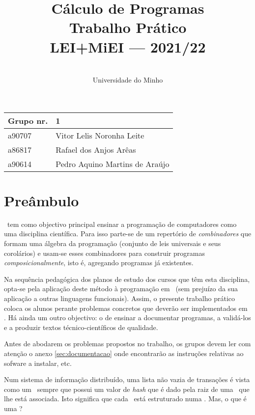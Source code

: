 \documentclass[a4paper]{article}
\title{
          Cálculo de Programas
\\
          Trabalho Prático
\\
          LEI+MiEI --- 2021/22
}
\author{
          \dium
\\
          Universidade do Minho
}
\date\mydate
\begin{document}
\maketitle

\begin{center}\large
\begin{tabular}{ll}
\textbf{Grupo} nr. & 1
\\\hline
a90707 & Vitor Lelis Noronha Leite
\\
a86817 & Rafael dos Anjos Arêas
\\ 
a90614 & Pedro Aquino Martins de Araújo
\end{tabular}
\end{center}

\section{Preâmbulo}

\CP\ tem como objectivo principal ensinar
a progra\-mação de computadores como uma disciplina científica. Para isso
parte-se de um repertório de \emph{combinadores} que formam uma álgebra da
programação (conjunto de leis universais e seus corolários) e usam-se esses
combinadores para construir programas \emph{composicionalmente}, isto é,
agregando programas já existentes.

Na sequência pedagógica dos planos de estudo dos cursos que têm
esta disciplina, opta-se pela aplicação deste método à programação
em \Haskell\ (sem prejuízo da sua aplicação a outras linguagens
funcionais). Assim, o presente trabalho prático coloca os
alunos perante problemas concretos que deverão ser implementados em
\Haskell.  Há ainda um outro objectivo: o de ensinar a documentar
programas, a validá-los e a produzir textos técnico-científicos de
qualidade.

Antes de abodarem os problemas propostos no trabalho, os grupos devem ler
com atenção o anexo \ref{sec:documentacao} onde encontrarão as instruções
relativas ao sofware a instalar, etc.


\Problema

Num sistema de informação distribuído, uma lista não vazia de transações
é vista como um \textit\blockchain\ sempre que possui um valor de \textit{hash}
que é dado pela raiz de uma \MerkleTree\ que lhe está associada. Isto significa
que cada \textit\blockchain\ está estruturado numa \MerkleTree.
Mas, o que é uma \MerkleTree?
\end{document}
